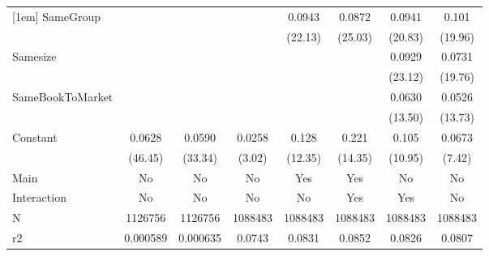 {\begin{tabular}{l*{7}{c}}
[1em]
SameGroup           &                     &                     &                     &      0.0943\sym{***}&      0.0872\sym{***}&      0.0941\sym{***}&       0.101\sym{***}\\
                    &                     &                     &                     &     (22.13)         &     (25.03)         &     (20.83)         &     (19.96)         \\
[1em]
Samesize            &                     &                     &                     &                     &                     &      0.0929\sym{***}&      0.0731\sym{***}\\
                    &                     &                     &                     &                     &                     &     (23.12)         &     (19.76)         \\
[1em]
SameBookToMarket    &                     &                     &                     &                     &                     &      0.0630\sym{***}&      0.0526\sym{***}\\
                    &                     &                     &                     &                     &                     &     (13.50)         &     (13.73)         \\
[1em]
Constant            &      0.0628\sym{***}&      0.0590\sym{***}&      0.0258\sym{**} &       0.128\sym{***}&       0.221\sym{***}&       0.105\sym{***}&      0.0673\sym{***}\\
                    &     (46.45)         &     (33.34)         &      (3.02)         &     (12.35)         &     (14.35)         &     (10.95)         &      (7.42)         \\
\hline
Main                &          No         &          No         &          No         &         Yes         &         Yes         &          No         &          No         \\
Interaction         &          No         &          No         &          No         &          No         &         Yes         &         Yes         &          No         \\
N                   &     1126756         &     1126756         &     1088483         &     1088483         &     1088483         &     1088483         &     1088483         \\
r2                  &    0.000589         &    0.000635         &      0.0743         &      0.0831         &      0.0852         &      0.0826         &      0.0807         \\

\end{tabular}}
